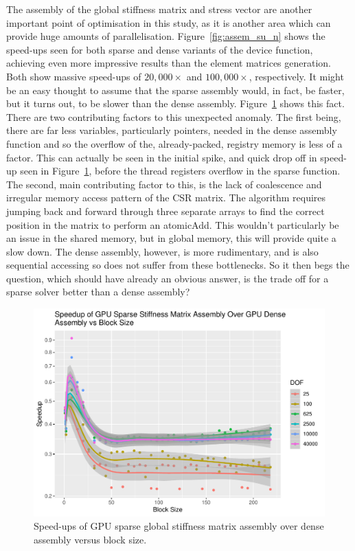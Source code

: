 The assembly of the global stiffness matrix and stress vector are another important point of optimisation in this study, as it is another area which can provide huge amounts of parallelisation. Figure~\ref{fig:assem_su_n} shows the speed-ups seen for both sparse and dense variants of the device function, achieving even more impressive results than the element matrices generation. Both show massive speed-ups of $20,000\times$ and $100,000\times$, respectively. It might be an easy thought to assume that the sparse assembly would, in fact, be faster, but it turns out, to be slower than the dense assembly. Figure~\ref{fig:sparse_dense_assem} shows this fact. There are two contributing factors to this unexpected anomaly. The first being, there are far less variables, particularly pointers, needed in the dense assembly function and so the overflow of the, already-packed, registry memory is less of a factor. This can actually be seen in the initial spike, and quick drop off in speed-up seen in Figure~\ref{fig:sparse_dense_assem}, before the thread registers overflow in the sparse function. The second, main contributing factor to this, is the lack of coalescence and irregular memory access pattern of the CSR matrix. The algorithm requires jumping back and forward through three separate arrays to find the correct position in the matrix to perform an atomicAdd. This wouldn't particularly be an issue in the shared memory, but in global memory, this will provide quite a slow down. The dense assembly, however, is more rudimentary, and is also sequential accessing so does not suffer from these bottlenecks. So it then begs the question, which should have already an obvious answer, is the trade off for a sparse solver better than a dense assembly?

\begin{figure}
	\centering
	\includegraphics[width=0.55\linewidth]{Plots/assem_dev_gpu_sparse_dense_speedup_vs_b}
	\caption{Speed-ups of GPU sparse global stiffness matrix assembly over dense assembly versus block size.}
	\label{fig:sparse_dense_assem}
\end{figure}

